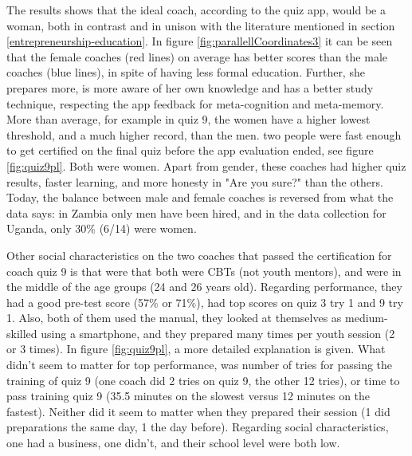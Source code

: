 

The results shows that the ideal coach, according to the quiz app, would be a woman, both in contrast and in unison with the literature mentioned in section \ref{entrepreneurship-education}. In figure \ref{fig:parallellCoordinates3} it can be seen that the female coaches (red lines) on average has better scores than the male coaches (blue lines), in spite of having less formal education. Further, she prepares more, is more aware of her own knowledge and has a better study technique, respecting the app feedback for meta-cognition and meta-memory. More than average, for example in quiz 9, the women have a higher lowest threshold, and a much higher record, than the men. two people were fast enough to get certified on the final quiz before the app evaluation ended, see figure \ref{fig:quiz9pl}. Both were women. Apart from gender, these coaches had higher quiz results, faster learning, and more honesty in "Are you sure?" than the others. Today, the balance between male and female coaches is reversed from what the data says: in Zambia only men have been hired, and in the data collection for Uganda, only 30\% (6/14) were women.

Other social characteristics on the two coaches that passed the certification for coach quiz 9 is that were that both were CBTs (not youth mentors), and were in the middle of the age groups (24 and 26 years old). Regarding performance, they had a good pre-test score (57\% or 71\%), had top scores on quiz 3 try 1 and 9 try 1. Also, both of them used the manual, they looked at themselves as medium-skilled using a smartphone, and they prepared many times per youth session (2 or 3 times). In figure \ref{fig:quiz9pl}, a more detailed explanation is given. What didn't seem to matter for top performance, was number of tries for passing the training of quiz 9 (one coach did 2 tries on quiz 9, the other 12 tries), or time to pass training quiz 9 (35.5 minutes on the slowest versus 12 minutes on the fastest). Neither did it seem to matter when they prepared their session (1 did preparations the same day, 1 the day before). Regarding social characteristics, one had a business, one didn't, and their school level were both low.

